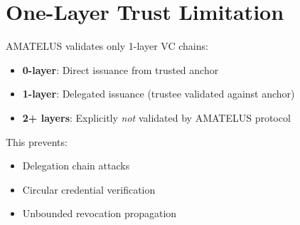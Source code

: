 \section{One-Layer Trust Limitation}

AMATELUS validates only 1-layer VC chains:

\begin{itemize}
  \item \textbf{0-layer}: Direct issuance from trusted anchor
  \item \textbf{1-layer}: Delegated issuance (trustee validated against anchor)
  \item \textbf{2+ layers}: Explicitly \emph{not} validated by AMATELUS protocol
\end{itemize}

This prevents:
\begin{itemize}
  \item Delegation chain attacks
  \item Circular credential verification
  \item Unbounded revocation propagation
\end{itemize}

